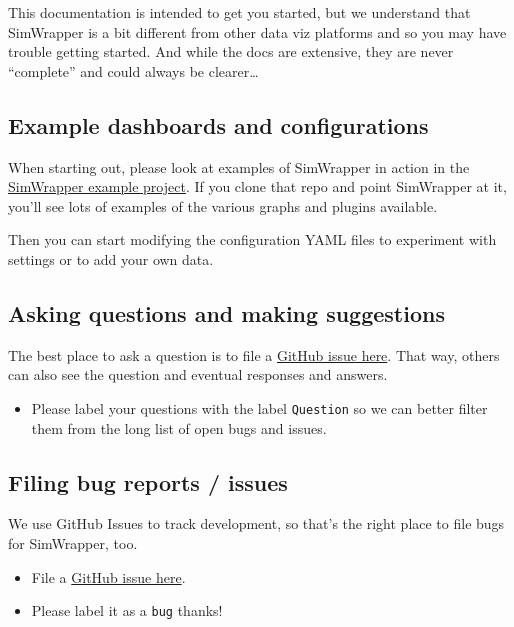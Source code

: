 This documentation is intended to get you started, but we understand
that SimWrapper is a bit different from other data viz platforms and so
you may have trouble getting started. And while the docs are extensive,
they are never ``complete'' and could always be clearer\ldots{}

\hypertarget{example-dashboards-and-configurations}{%
\subsection{Example dashboards and
configurations}\label{example-dashboards-and-configurations}}

When starting out, please look at examples of SimWrapper in action in
the
\href{https://github.com/simwrapper/simwrapper-example-project}{SimWrapper
example project}. If you clone that repo and point SimWrapper at it,
you'll see lots of examples of the various graphs and plugins available.

Then you can start modifying the configuration YAML files to experiment
with settings or to add your own data.

\hypertarget{asking-questions-and-making-suggestions}{%
\subsection{Asking questions and making
suggestions}\label{asking-questions-and-making-suggestions}}

The best place to ask a question is to file a
\href{https://github.com/simwrapper/simwrapper/issues}{GitHub issue
here}. That way, others can also see the question and eventual responses
and answers.

\begin{itemize}
\tightlist
\item
  Please label your questions with the label \texttt{Question} so we can
  better filter them from the long list of open bugs and issues.
\end{itemize}

\hypertarget{filing-bug-reports-issues}{%
\subsection{Filing bug reports /
issues}\label{filing-bug-reports-issues}}

We use GitHub Issues to track development, so that's the right place to
file bugs for SimWrapper, too.

\begin{itemize}
\tightlist
\item
  File a \href{https://github.com/simwrapper/simwrapper/issues}{GitHub
  issue here}.
\item
  Please label it as a \texttt{bug} thanks!
\end{itemize}

